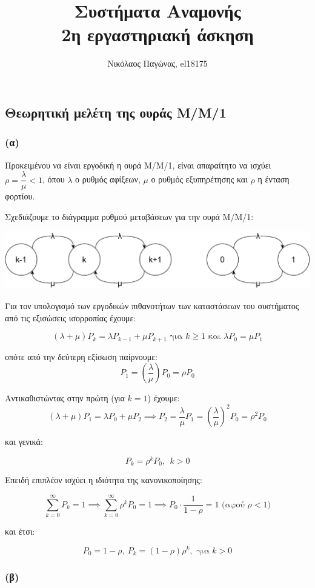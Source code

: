 \documentclass[a4paper]{article}
\title{Συστήματα Αναμονής \\ 2η εργαστηριακή άσκηση}
\author{Νικόλαος Παγώνας, el18175}
\date{}
\begin{document}
\maketitle

\subsection*{Θεωρητική μελέτη της ουράς Μ/Μ/1}

\subsubsection*{(α)} Προκειμένου να είναι εργοδική η ουρά Μ/Μ/1, είναι απαραίτητο να ισχύει $ {ρ = \dfrac{λ}{μ} < 1} $, όπου $ λ $ ο ρυθμός αφίξεων, $ μ $ ο ρυθμός εξυπηρέτησης και $ ρ $ η ένταση φορτίου.

Σχεδιάζουμε το διάγραμμα ρυθμού μεταβάσεων για την ουρά Μ/Μ/1:

\begin{center}
	\includegraphics[width=\textwidth]{files/1a.pdf} 
\end{center}

Για τον υπολογισμό των εργοδικών πιθανοτήτων των καταστάσεων του συστήματος από τις εξισώσεις ισορροπίας έχουμε:

\[
	(λ+μ)P_k=λP_{k-1}+μP_{k+1} \text{  για  } k \geq 1 \text{  και  } λP_0=μP_1 
\]

οπότε από την δεύτερη εξίσωση  παίρνουμε:
\[
	P_1=\left(\frac{λ}{μ}\right)P_0 = ρP_0
\]

Αντικαθιστώντας στην πρώτη (για $k=1$) έχουμε:
\[
	(λ+μ)P_1=λP_0+μP_2 \implies P_2=\frac{λ}{μ}P_1=\left(\frac{λ}{μ}\right)^2P_0 = ρ^2P_0
\]

και γενικά:

\[
	P_k = ρ^kP_0, \ \ k>0 
\]

Επειδή επιπλέον ισχύει η ιδιότητα της κανονικοποίησης:

\[
	\sum_{k=0}^\infty P_k = 1 \implies 
	\sum_{k=0}^\infty ρ^kP_0=1 \implies
	P_0\cdot\frac{1}{1-ρ} = 1 \text{ (αφού } ρ < 1)
\] 

και έτσι:

\[
	P_0 = 1-ρ, \ P_k = (1-ρ)ρ^k, \text{ για } k > 0
\]

\subsubsection*{(β)}
\end{document}

